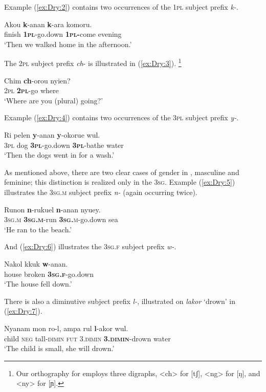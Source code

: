 \documentclass[output=collectionpaper]{langsci/langscibook}
\begin{document}
Example (\ref{ex:Dry:2}) contains two occurrences of the \textsc{1pl} subject prefix \textit{k-}.

\ea \label{ex:Dry:2}
\gll Akou \textbf{k}-anan \textbf{k}-ara komoru.\\
finish \textbf{\textsc{1pl}}-go.down \textbf{\textsc{1pl-}}come evening\\
\glt `Then we walked home in the afternoon.'
\z

The \textsc{2pl} subject prefix \textit{ch}- is illustrated in (\ref{ex:Dry:3}).%
\footnote{Our orthography for  employs three digraphs, <ch> for [tʃ], <ng> for [ŋ], and <ny> for [ɲ].}

\ea \label{ex:Dry:3}
\gll
Chim	 \textbf{ch}-orou nyien?\\
\textsc{2pl} \textbf{\textsc{2pl}}-go where\\
\glt `Where are you (plural) going?'
\z

Example (\ref{ex:Dry:4}) contains two occurrences of the \textsc{3pl} subject prefix \textit{y-}.

\ea \label{ex:Dry:4}
\gll Ri	pelen	\textbf{y}-anan	\textbf{y}-okorue	wul.\\
\textsc{3pl} dog \textbf{\textsc{3pl}}-go.down \textbf{\textsc{3pl}}-bathe water\\
\glt `Then the dogs went in for a wash.'
\z

As mentioned above, there are two clear cases of gender in , masculine and feminine; this distinction is realized only in the \textsc{3sg}. Example (\ref{ex:Dry:5}) illustrates the \textsc{3sg.m} subject prefix \textit{n-} (again occurring twice).

\ea \label{ex:Dry:5}
\gll Runon	\textbf{n}-rukuel 	\textbf{n}-anan	nyuey.\\
\textsc{3sg.m} \textbf{\textsc{3sg.m}}-run \textbf{\textsc{3sg.}}\textsc{m}-go.down sea\\
\glt `He ran to the beach.'
\z

And (\ref{ex:Dry:6}) illustrates the \textsc{3sg.f} subject prefix \textit{w-}.

\ea \label{ex:Dry:6}
\gll Nakol	kkuk	\textbf{w}-anan.\\
house broken \textbf{\textsc{3sg.f}}-go.down\\
\glt `The house fell down.'
\z

There is also a diminutive subject prefix \textit{l-}, illustrated on \textit{lakor} `drown' in (\ref{ex:Dry:7}).

\ea \label{ex:Dry:7}
\gll Nyanam	mon	ro-l,	ampa	rul \textbf{l}-akor	wul.\\
child \textsc{neg} tall-\textsc{dimin} \textsc{fut} \textsc{3.dimin} \textbf{\textsc{3.dimin}}-drown water\\
\glt `The child is small, she will drown.'
\z
\end{document}
